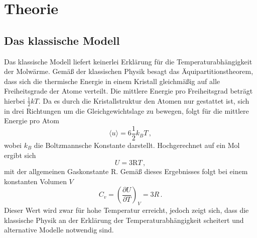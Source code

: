 \section{Theorie}
\subsection{Das klassische Modell}
Das klassische Modell liefert keinerlei Erklärung für die Temperaturabhängigkeit der Molwärme. Gemäß der klassischen Physik besagt das Äquipartitionstheorem, dass
sich die thermische Energie in einem Kristall gleichmäßig auf alle Freiheitsgrade der Atome verteilt. Die mittlere Energie pro Freiheitsgrad beträgt hierbei $\frac{1}{2}kT$. Da
es durch die Kristallstruktur den Atomen nur gestattet ist, sich in drei Richtungen um die Gleichgewichtslage zu bewegen, folgt für die mittlere Energie pro Atom
\begin{equation}
  \langle u \rangle = 6 \frac{1}{2}k_BT\, ,
\end{equation}
wobei $k_B$ die Boltzmannsche Konstante darstellt. Hochgerechnet auf ein Mol ergibt sich
\begin{equation}
  U = 3 \text{R}T \, ,
\end{equation}
mit der allgemeinen Gaskonstante R. Gemäß dieses Ergebnisses folgt bei einem konstanten Volumen $V$
\begin{equation}
  C_v= \left(\frac{\partial U}{\partial T}\right)_V=3R\, .
\end{equation}
Dieser Wert wird zwar für hohe Temperatur erreicht, jedoch zeigt sich, dass die klassische Physik an der Erklärung der Temperaturabhängigkeit scheitert
und alternative Modelle notwendig sind.
